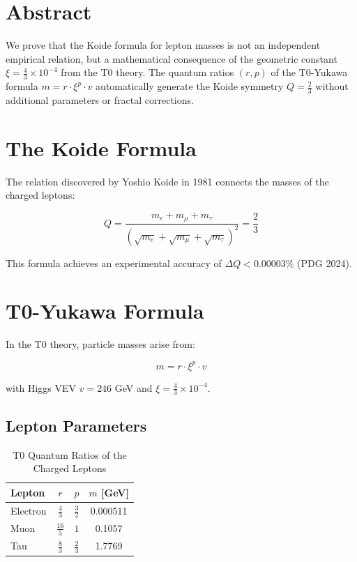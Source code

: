 \section*{Abstract}
		We prove that the Koide formula for lepton masses is not an independent empirical relation, but a mathematical consequence of the geometric constant $\xi = \frac{4}{3} \times 10^{-4}$ from the T0 theory. The quantum ratios $(r,p)$ of the T0-Yukawa formula $m = r \cdot \xi^p \cdot v$ automatically generate the Koide symmetry $Q = \frac{2}{3}$ without additional parameters or fractal corrections.

	
	\section{The Koide Formula}
	
	The relation discovered by Yoshio Koide in 1981 connects the masses of the charged leptons:
	
	\begin{equation}
		Q = \frac{m_e + m_\mu + m_\tau}{\left( \sqrt{m_e} + \sqrt{m_\mu} + \sqrt{m_\tau} \right)^2} = \frac{2}{3}
		\label{eq:koide}
	\end{equation}
	
	This formula achieves an experimental accuracy of $\Delta Q < 0.00003\%$ (PDG 2024).
	
	\section{T0-Yukawa Formula}
	
	In the T0 theory, particle masses arise from:
	
	\begin{equation}
		m = r \cdot \xi^p \cdot v
		\label{eq:t0yukawa}
	\end{equation}
	
	with Higgs VEV $v = 246$ GeV and $\xi = \frac{4}{3} \times 10^{-4}$.
	
	\subsection{Lepton Parameters}
	
	\begin{table}[h]
		\centering
		\begin{tabular}{lccc}
			\toprule
			\textbf{Lepton} & \textbf{$r$} & \textbf{$p$} & \textbf{$m$ [GeV]} \\
			\midrule
			Electron & $\frac{4}{3}$ & $\frac{3}{2}$ & 0.000511 \\
			Muon & $\frac{16}{5}$ & $1$ & 0.1057 \\
			Tau & $\frac{8}{3}$ & $\frac{2}{3}$ & 1.7769 \\
			\bottomrule
		\end{tabular}
		\caption{T0 Quantum Ratios of the Charged Leptons}
	\end{table}
	

